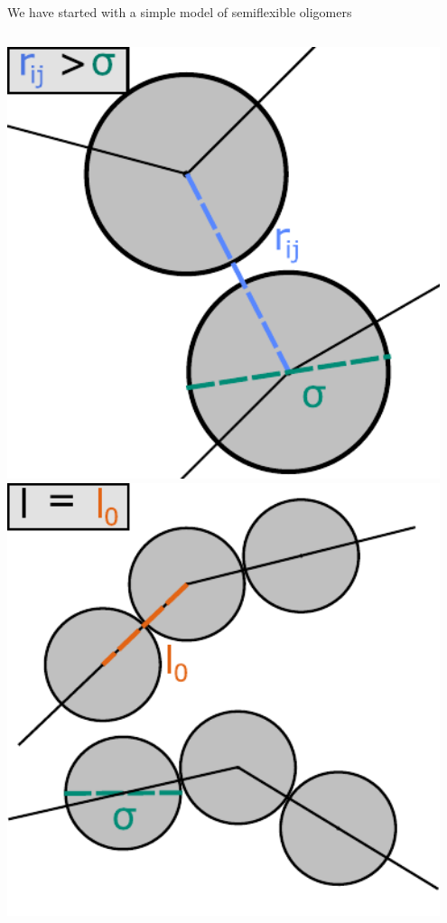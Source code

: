 \documentclass[aspectratio=169]{beamer}
\begin{document}
\begin{frame}[c]{We have started with a simple model of semiflexible oligomers}
\begin{columns}[T]


    \centering
    \vspace{\baselineskip}

       {\includegraphics[width=0.95\textwidth]{../figures/fig-hard_tang_step_model/fig-HS_pair_pot.pdf}}
       {\includegraphics[width=0.95\textwidth]{../figures/fig-hard_tang_step_model/fig-tangent_bond.pdf}}

\end{columns}
\end{frame}
\end{document}
